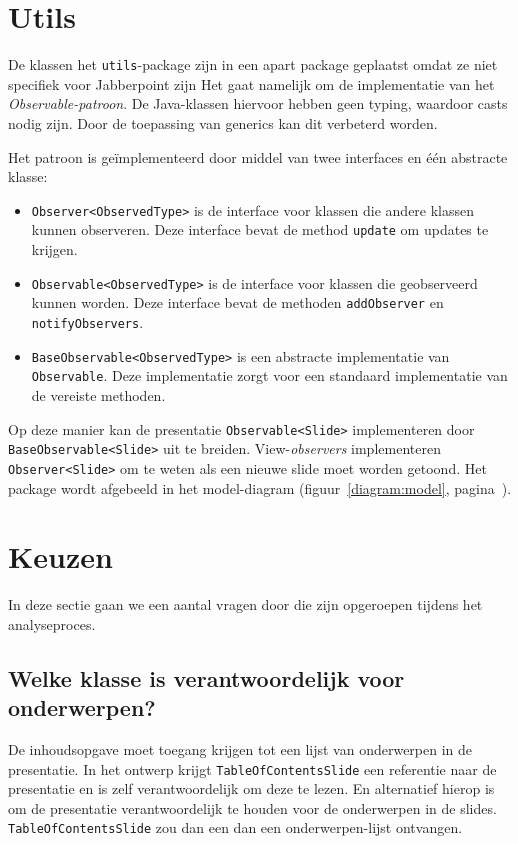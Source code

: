 \documentclass[a4paper]{article}
\newcommand{\question}[1]{
  \subsection{#1}
}
\newcommand{\code}[1]{\lstinline[columns=fixed]{#1}}
\begin{document}
	\section{Utils}\label{sec:utils}
		De klassen het \code{utils}-package zijn in een apart package geplaatst omdat ze niet specifiek voor Jabberpoint zijn
		Het gaat namelijk om de implementatie van het \textit{Observable-patroon}.
		De Java-klassen hiervoor hebben geen typing, waardoor casts nodig zijn.
		Door de toepassing van generics kan dit verbeterd worden.
		
		Het patroon is geïmplementeerd door middel van twee interfaces en één abstracte klasse:
		\begin{itemize}
			\item \code{Observer<ObservedType>} is de interface voor klassen die andere klassen kunnen observeren.
				Deze interface bevat de method \code{update} om updates te krijgen.
			\item \code{Observable<ObservedType>} is de interface voor klassen die geobserveerd kunnen worden.
				Deze interface bevat de methoden \code{addObserver} en \code{notifyObservers}.
			\item \code{BaseObservable<ObservedType>} is een abstracte implementatie van \code{Observable}.
				Deze implementatie zorgt voor een standaard implementatie van de vereiste methoden.
		\end{itemize}

		Op deze manier kan de presentatie \code{Observable<Slide>} implementeren door \code{BaseObservable<Slide>} uit te breiden.
		View-\textit{observers} implementeren \code{Observer<Slide>} om te weten als een nieuwe slide moet worden getoond.
		Het package wordt afgebeeld in het model-diagram (figuur~\ref{diagram:model}, pagina~\pageref{diagram:model}).

\section{Keuzen}\label{sec:keuzen}
    In deze sectie gaan we een aantal vragen door die zijn opgeroepen tijdens het analyseproces.
   
    \question{Welke klasse is verantwoordelijk voor onderwerpen?}
		De inhoudsopgave moet toegang krijgen tot een lijst van onderwerpen in de presentatie.
		In het ontwerp krijgt \code{TableOfContentsSlide} een referentie naar de presentatie en is zelf verantwoordelijk om deze te lezen.
		En alternatief hierop is om de presentatie verantwoordelijk te houden voor de onderwerpen in de slides.
		\code{TableOfContentsSlide} zou dan een dan een onderwerpen-lijst ontvangen.
\end{document}
